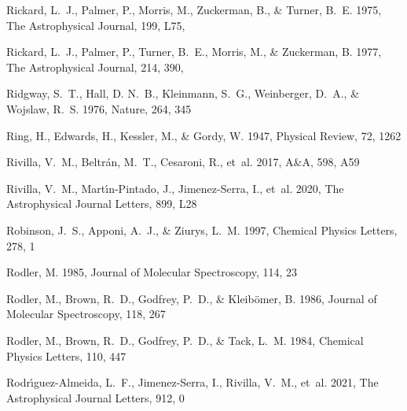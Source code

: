 \documentclass[twocolumn]{aastex631}
\begin{document}
\begin{thebibliography}{}
{Rickard}, L.~J., {Palmer}, P., {Morris}, M., {Zuckerman}, B., \& {Turner},
  B.~E. 1975, The Astrophysical Journal, 199, L75, 

{Rickard}, L.~J., {Palmer}, P., {Turner}, B.~E., {Morris}, M., \& {Zuckerman},
  B. 1977, The Astrophysical Journal, 214, 390, 

Ridgway, S.~T., Hall, D. N.~B., Kleinmann, S.~G., Weinberger, D.~A., \&
  Wojslaw, R.~S. 1976, Nature, 264, 345

Ring, H., Edwards, H., Kessler, M., \& Gordy, W. 1947, Physical Review, 72,
  1262

Rivilla, V.~M., Beltr{\'a}n, M.~T., Cesaroni, R., {et~al.} 2017, A{\&}A, 598,
  A59

Rivilla, V.~M., Mart{\'\i}n-Pintado, J., Jimenez-Serra, I., {et~al.} 2020, The
  Astrophysical Journal Letters, 899, L28

Robinson, J.~S., Apponi, A.~J., \& Ziurys, L.~M. 1997, Chemical Physics
  Letters, 278, 1

Rodler, M. 1985, Journal of Molecular Spectroscopy, 114, 23

Rodler, M., Brown, R.~D., Godfrey, P.~D., \& Kleib{\"o}mer, B. 1986, Journal of
  Molecular Spectroscopy, 118, 267

Rodler, M., Brown, R.~D., Godfrey, P.~D., \& Tack, L.~M. 1984, Chemical Physics
  Letters, 110, 447

Rodr{\'\i}guez-Almeida, L.~F., Jimenez-Serra, I., Rivilla, V.~M., {et~al.}
  2021, The Astrophysical Journal Letters, 912, 0


\end{thebibliography}
\end{document}
